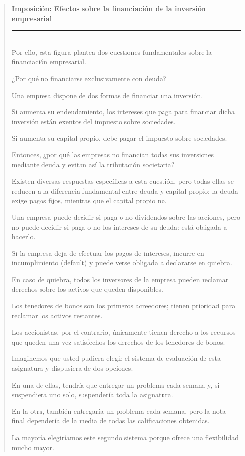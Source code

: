 \documentclass[10pt,a4paper]{article}
\newenvironment{specialblock}[1]{%
      \begin{quote} %
      \small %
      \noindent\textbf{#1}\\[-0.3em] %
      \rule{\linewidth}{0.4pt}\\[0.6em]}{
      \end{quote}}
\begin{document}
\begin{specialblock}{Imposición: Efectos sobre la financiación de la inversión empresarial}
    Por ello, esta figura plantea dos cuestiones fundamentales sobre la financiación empresarial.
    
    ¿Por qué no financiarse exclusivamente con deuda?
    
    Una empresa dispone de dos formas de financiar una inversión.
    
    Si aumenta su endeudamiento, los intereses que paga para financiar dicha inversión están exentos del impuesto sobre sociedades.
    
    Si aumenta su capital propio, debe pagar el impuesto sobre sociedades.
    
    Entonces, ¿por qué las empresas no financian todas sus inversiones mediante deuda y evitan así la tributación societaria?
    
    Existen diversas respuestas específicas a esta cuestión, pero todas ellas se reducen a la diferencia fundamental entre deuda y capital propio: la deuda exige pagos fijos, mientras que el capital propio no.
    
    Una empresa puede decidir si paga o no dividendos sobre las acciones, pero no puede decidir si paga o no los intereses de su deuda: está obligada a hacerlo.
    
    Si la empresa deja de efectuar los pagos de intereses, incurre en incumplimiento (default) y puede verse obligada a declararse en quiebra.
    
    En caso de quiebra, todos los inversores de la empresa pueden reclamar derechos sobre los activos que queden disponibles.
    
    Los tenedores de bonos son los primeros acreedores; tienen prioridad para reclamar los activos restantes.
    
    Los accionistas, por el contrario, únicamente tienen derecho a los recursos que queden una vez satisfechos los derechos de los tenedores de bonos.
    
    Imaginemos que usted pudiera elegir el sistema de evaluación de esta asignatura y dispusiera de dos opciones.
    
    En una de ellas, tendría que entregar un problema cada semana y, si suspendiera uno solo, suspendería toda la asignatura.
    
    En la otra, también entregaría un problema cada semana, pero la nota final dependería de la media de todas las calificaciones obtenidas.
    
    La mayoría elegiríamos este segundo sistema porque ofrece una flexibilidad mucho mayor.
    

\end{specialblock}
\end{document}
